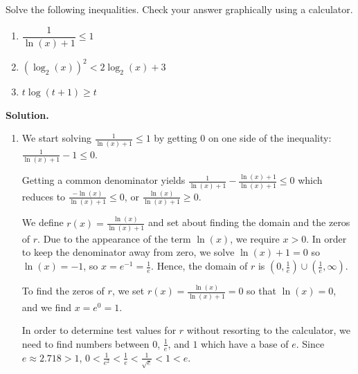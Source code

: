 \documentclass{ximera}
\begin{document}
\begin{ex}  Solve the following inequalities.  Check your answer graphically using a calculator.
\label{logineq}

\begin{multicols}{3}

\begin{enumerate}

\item  $\dfrac{1}{\ln(x)+1} \leq 1$

\item  $\left(\log_{2}(x)\right)^2 < 2 \log_{2}(x) + 3$

\item  $t \log(t+1) \geq t$


\end{enumerate}

\end{multicols}


{\bf Solution.}  

\begin{enumerate}

\item  We start solving $\frac{1}{\ln(x)+1} \leq 1$ by getting $0$ on one side of the inequality: $\frac{1}{\ln(x)+1}  - 1 \leq 0$.  

\smallskip

Getting a common denominator yields $\frac{1}{\ln(x)+1}  - \frac{\ln(x)+1}{\ln(x)+1} \leq 0$ which reduces to $\frac{-\ln(x)}{\ln(x)+1} \leq 0$, or $ \frac{\ln(x)}{\ln(x)+1} \geq 0$.  

\smallskip

We define $r(x) = \frac{\ln(x)}{\ln(x)+1}$ and set about finding the domain and the zeros of $r$.  Due to the appearance of the term $\ln(x)$, we require  $x > 0$.  In order to keep the denominator away from zero, we solve $\ln(x)+1 = 0$ so $\ln(x) = -1$, so $x = e^{-1} = \frac{1}{e}$.  Hence, the domain of $r$ is $\left(0, \frac{1}{e}\right) \cup \left(\frac{1}{e}, \infty\right)$. 

\smallskip

To find the zeros of $r$, we set $r(x) = \frac{\ln(x)}{\ln(x)+1} = 0$ so that $\ln(x) = 0$, and we find $x = e^{0} = 1$.  


\smallskip

In order to determine test values for $r$ without resorting to the calculator, we need to find numbers between $0$, $\frac{1}{e}$, and $1$ which have a base of $e$.  Since $e \approx 2.718 > 1$, $0 < \frac{1}{e^2} < \frac{1}{e} < \frac{1}{\sqrt{e}} < 1 < e$.  


\end{enumerate}
\end{ex}
\end{document}
